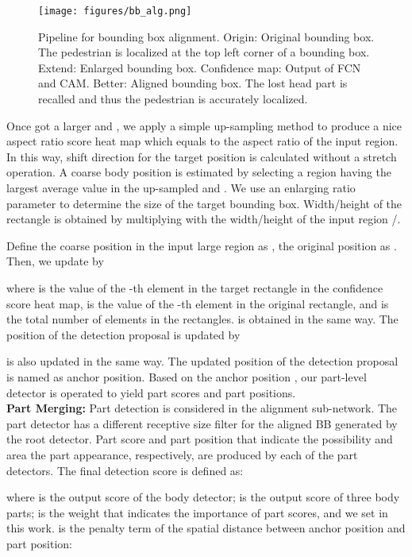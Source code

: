 \documentclass[journal]{IEEEtran}
\begin{document}
 \begin{figure*}[t]
\centering
\centerline{\texttt{[image: figures/bb\_alg.png]}}
\caption{Pipeline for bounding box alignment. Origin: Original bounding box. The pedestrian is localized at the top left corner of a bounding box. Extend: Enlarged bounding box. Confidence map: Output of FCN and CAM. Better: Aligned bounding box. The lost head part is recalled and thus the pedestrian is accurately localized. }
\label{fig:example}
\end{figure*}

Once got a larger  and , we apply a simple up-sampling method to produce a nice aspect ratio score heat map which equals to the aspect ratio of the input region. In this way, shift direction for the target position is calculated without a stretch operation. A coarse body position is estimated by selecting a region having the largest average value in the up-sampled  and . We use an enlarging ratio parameter  to determine the size of the target bounding box. Width/height of the rectangle  is obtained by multiplying  with the width/height of the input region /.



Define the coarse position in the input large region as , the original position as .
Then, we update  by



where  is the value of the -th element in the target rectangle in the confidence score heat map,  is the value of the -th element in the original rectangle, and  is the total number of elements in the rectangles.  is obtained in the same way. The position of the detection proposal is updated by



 is also updated in the same way. The updated position of the detection proposal  is named as anchor position. Based on the anchor position , our part-level detector is operated to yield part scores and part positions. \\

\textbf{Part Merging:} Part detection is considered in the alignment sub-network. The part detector has a different receptive size filter for the aligned BB generated by the root detector. Part score  and part position  that indicate the possibility and area the part appearance, respectively, are produced by each of the part detectors. The final detection score is defined as:



where  is the output score of the body detector;  is the output score of three body parts;  is the weight that indicates the importance of part scores, and we set  in this work.  is the penalty term of the spatial distance between anchor position and part position:
\end{document}

